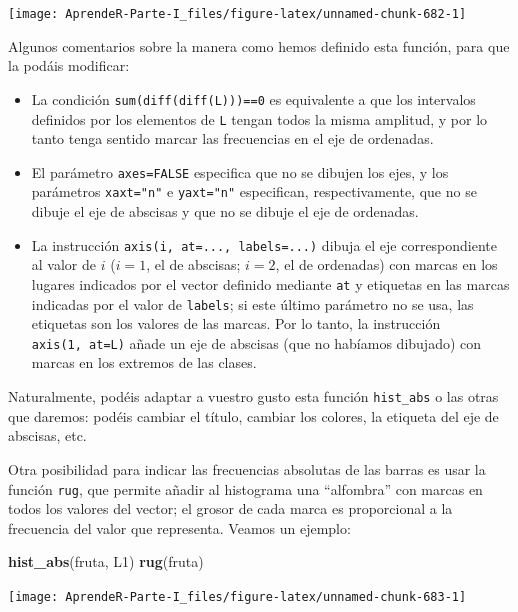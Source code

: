 \documentclass[]{book}
\newenvironment{Shaded}{\begin{snugshade}}{\end{snugshade}}
\newcommand{\KeywordTok}[1]{\textcolor[rgb]{0.13,0.29,0.53}{\textbf{#1}}}
\newcommand{\NormalTok}[1]{#1}
\theoremstyle{definition}
\theoremstyle{definition}
\theoremstyle{definition}
\theoremstyle{remark}
\begin{document}
\begin{center}\texttt{[image: AprendeR-Parte-I\_files/figure-latex/unnamed-chunk-682-1]} \end{center}

Algunos comentarios sobre la manera como hemos definido esta función, para que la podáis modificar:

\begin{itemize}
\item
  La condición \texttt{sum(diff(diff(L)))==0} es equivalente a que los intervalos definidos por los elementos de \texttt{L} tengan todos la misma amplitud, y por lo tanto tenga sentido marcar las frecuencias en el eje de ordenadas.
\item
  El parámetro \texttt{axes=FALSE} especifica que no se dibujen los ejes, y los parámetros \texttt{xaxt="n"} e \texttt{yaxt="n"} especifican, respectivamente, que no se dibuje el eje de abscisas y que no se dibuje el eje de ordenadas.
\item
  La instrucción \texttt{axis(i,\ at=...,\ labels=...)} dibuja el eje correspondiente al valor de \(i\) (\(i=1\), el de abscisas; \(i=2\), el de ordenadas) con marcas en los lugares indicados por el vector definido mediante \texttt{at} y etiquetas en las marcas indicadas por el valor de \texttt{labels}; si este último parámetro no se usa, las etiquetas son los valores de las marcas. Por lo tanto, la instrucción \texttt{axis(1,\ at=L)} añade un eje de abscisas (que no habíamos dibujado) con marcas en los extremos de las clases.
\end{itemize}

Naturalmente, podéis adaptar a vuestro gusto esta función \texttt{hist\_abs} o las otras que daremos: podéis cambiar el título, cambiar los colores, la etiqueta del eje de abscisas, etc.

Otra posibilidad para indicar las frecuencias absolutas de las barras es usar la función \texttt{rug}, que permite añadir al histograma una ``alfombra'' con marcas en todos los valores del vector; el grosor de cada marca es proporcional a la frecuencia del valor que representa.
Veamos un ejemplo:

\begin{Shaded}
\begin{Highlighting}[]
\KeywordTok{hist_abs}\NormalTok{(fruta, L1)}
\KeywordTok{rug}\NormalTok{(fruta)}
\end{Highlighting}
\end{Shaded}

\begin{center}\texttt{[image: AprendeR-Parte-I\_files/figure-latex/unnamed-chunk-683-1]} \end{center}
\end{document}
